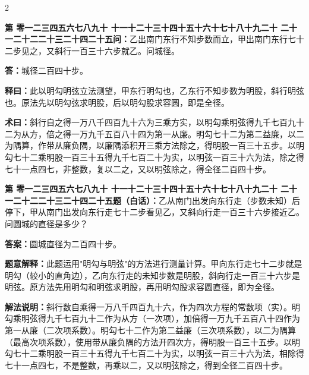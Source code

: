 \documentclass[10pt,a4paper]{article}
\newcounter{probnum}
\newcounter{probnumvol}[section]
\newcommand{\chnum}[1]{%
  \ifcase#1 零\or 一\or 二\or 三\or 四\or 五\or 六\or 七\or 八\or 九\or 十\or
    十一\or 十二\or 十三\or 十四\or 十五\or 十六\or 十七\or 十八\or 十九\or 二十\or
    二十一\or 二十二\or 二十三\or 二十四\or 二十五\fi}
\newcommand{\problemclassical}[1]{%
  \stepcounter{probnumvol}%
  \par\noindent
  \textcolor{classicalcolor}{\textbf{第\chnum{\value{probnumvol}}问：}}#1\par\smallskip
}
\newcommand{\problemmodern}[1]{%
  \par\noindent
  \textcolor{moderncolor}{\textbf{第\chnum{\value{probnumvol}}题（白话）：}}#1\par\smallskip
}
\newcommand{\answerclassical}[1]{%
  \par\noindent\textcolor{classicalcolor}{\textbf{答：}}#1\par
}
\newcommand{\answermodern}[1]{%
  \par\noindent\textcolor{moderncolor}{\textbf{答案：}}#1\par
}
\newcommand{\shiyiclassical}[1]{%
  \par\noindent\textcolor{classicalcolor}{\textbf{释曰：}}#1\par
}
\newcommand{\shiyimodern}[1]{%
  \par\noindent\textcolor{moderncolor}{\textbf{题意解释：}}#1\par
}
\newcommand{\shuyueclassical}[1]{%
  \par\noindent\textcolor{classicalcolor}{\textbf{术曰：}}#1\par
}
\newcommand{\shuyuemodern}[1]{%
  \par\noindent\textcolor{moderncolor}{\textbf{解法说明：}}#1\par
}
\begin{document}
\begin{paracol}{2}

\problemclassical{乙出南门东行不知步数而立，甲出南门东行七十二步见之，又斜行一百三十六步就乙。问城径。}

\answerclassical{城径二百四十步。}

\shiyiclassical{此以明勾明弦立法测望，甲东行明勾也，乙东行不知步数为明股，斜行明弦也。原法先以明勾弦求明股，后以明勾股求容圆，即是全径。}

\shuyueclassical{斜行自之得一万八千四百九十六为三乘方实，以明勾乘明弦得九千七百九十二为从方，倍之得一万九千五百八十四为第一从廉。明勾七十二为第二益廉，以二为隅算，作带从廉负隅，以廉隅添积开三乘方法除之，得明股一百三十五步。以明勾七十二乘明股一百三十五得九千七百二十为实，以明弦一百三十六为法，除之得七十一点四七，非整数，复以二之，又以明弦除之，得全径二百四十步。}

\switchcolumn

\problemmodern{乙从南门出发向东行走（步数未知）后停下，甲从南门出发向东行走七十二步看见乙，又斜向行走一百三十六步接近乙。问圆城的直径是多少？}

\answermodern{圆城直径为二百四十步。}

\shiyimodern{此题运用"明勾与明弦"的方法进行测量计算。甲向东行走七十二步就是明勾（较小的直角边），乙向东行走的未知步数是明股，斜向行走一百三十六步是明弦。原方法先用明勾和明弦求明股，再用明勾股求容圆直径，即为全径。}

\shuyuemodern{斜行数自乘得一万八千四百九十六，作为四次方程的常数项（实）。明勾乘明弦得九千七百九十二作为从方（一次项），加倍得一万九千五百八十四作为第一从廉（二次项系数）。明勾七十二作为第二益廉（三次项系数），以二为隅算（最高次项系数），使用带从廉负隅的方法开四次方，得明股一百三十五步。以明勾七十二乘明股一百三十五得九千七百二十为实，以明弦一百三十六为法，相除得七十一点四七，不是整数，再乘以二，又以明弦除之，得到全径二百四十步。}

\end{paracol}

\vspace{0.3cm}
\end{document}
